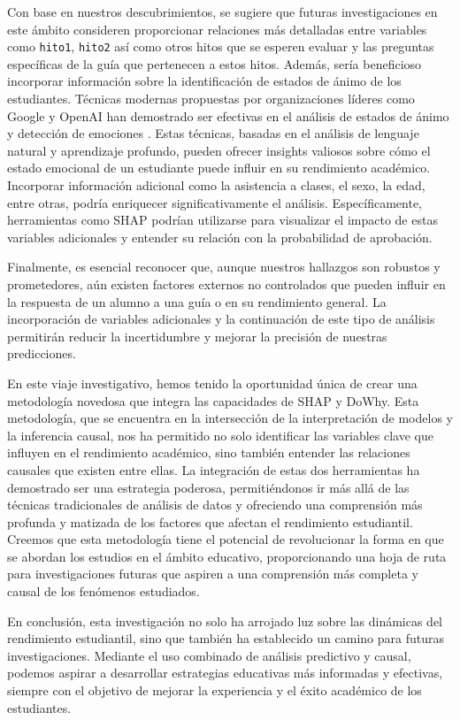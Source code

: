 Con base en nuestros descubrimientos, se sugiere que futuras investigaciones en este ámbito consideren proporcionar relaciones más detalladas entre variables como \texttt{hito1}, \texttt{hito2} así como otros hitos que se esperen evaluar y las preguntas específicas de la guía que pertenecen a estos hitos. Además, sería beneficioso incorporar información sobre la identificación de estados de ánimo de los estudiantes. Técnicas modernas propuestas por organizaciones líderes como Google y OpenAI han demostrado ser efectivas en el análisis de estados de ánimo y detección de emociones \cite{google_mood_tracking_2022, google_sentiment_api_2022, openai_sentiment_neuron_2022, openai_sentiment_analysis_2022, openai_gpt_emotion_2022, openai_chatgpt_emotion_2023}. Estas técnicas, basadas en el análisis de lenguaje natural y aprendizaje profundo, pueden ofrecer insights valiosos sobre cómo el estado emocional de un estudiante puede influir en su rendimiento académico. Incorporar información adicional como la asistencia a clases, el sexo, la edad, entre otras, podría enriquecer significativamente el análisis. Específicamente, herramientas como SHAP podrían utilizarse para visualizar el impacto de estas variables adicionales y entender su relación con la probabilidad de aprobación.


Finalmente, es esencial reconocer que, aunque nuestros hallazgos son robustos y prometedores, aún existen factores externos no controlados que pueden influir en la respuesta de un alumno a una guía o en su rendimiento general. La incorporación de variables adicionales y la continuación de este tipo de análisis permitirán reducir la incertidumbre y mejorar la precisión de nuestras predicciones.

En este viaje investigativo, hemos tenido la oportunidad única de crear una metodología novedosa que integra las capacidades de SHAP y DoWhy. Esta metodología, que se encuentra en la intersección de la interpretación de modelos y la inferencia causal, nos ha permitido no solo identificar las variables clave que influyen en el rendimiento académico, sino también entender las relaciones causales que existen entre ellas. La integración de estas dos herramientas ha demostrado ser una estrategia poderosa, permitiéndonos ir más allá de las técnicas tradicionales de análisis de datos y ofreciendo una comprensión más profunda y matizada de los factores que afectan el rendimiento estudiantil. Creemos que esta metodología tiene el potencial de revolucionar la forma en que se abordan los estudios en el ámbito educativo, proporcionando una hoja de ruta para investigaciones futuras que aspiren a una comprensión más completa y causal de los fenómenos estudiados.

En conclusión, esta investigación no solo ha arrojado luz sobre las dinámicas del rendimiento estudiantil, sino que también ha establecido un camino para futuras investigaciones. Mediante el uso combinado de análisis predictivo y causal, podemos aspirar a desarrollar estrategias educativas más informadas y efectivas, siempre con el objetivo de mejorar la experiencia y el éxito académico de los estudiantes.
